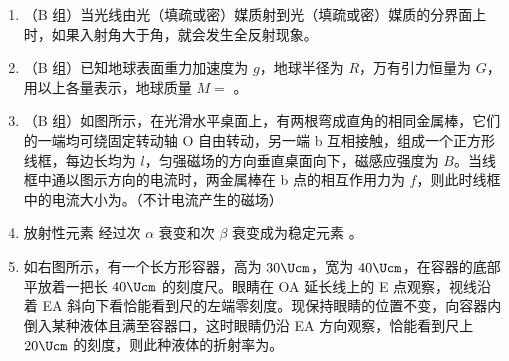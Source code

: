\documentclass[\gkver]{gaokaozhenti}
\begin{document}
\begin{enumerate}
\item
（B 组）当光线由光（填疏或密）媒质射到光（填疏或密）媒质的分界面上时，如果入射角大于角，就会发生全反射现象。

\item
（B 组）已知地球表面重力加速度为 $g$，地球半径为 $R$，万有引力恒量为 $G$，用以上各量表示，地球质量 $M =$ 。

\item
（B 组）如图所示，在光滑水平桌面上，有两根弯成直角的相同金属棒，它们的一端均可绕固定转动轴 O 自由转动，另一端 b 互相接触，组成一个正方形线框，每边长均为 $l$，匀强磁场的方向垂直桌面向下，磁感应强度为 $B$。当线框中通以图示方向的电流时，两金属棒在 b 点的相互作用力为 $f$，则此时线框中的电流大小为。（不计电流产生的磁场）
\onepicture[align=right, h=3.61cm]{}

\item
放射性元素  经过次 $\alpha$ 衰变和次 $\beta$ 衰变成为稳定元素 。

\item
如右图所示，有一个长方形容器，高为 $30\Ucm$，宽为 $40\Ucm$，在容器的底部平放着一把长 $40\Ucm$ 的刻度尺。眼睛在 OA 延长线上的 E 点观察，视线沿着 EA 斜向下看恰能看到尺的左端零刻度。现保持眼睛的位置不变，向容器内倒入某种液体且满至容器口，这时眼睛仍沿 EA 方向观察，恰能看到尺上 $20\Ucm$ 的刻度，则此种液体的折射率为。
\onepicture[align=right, w=4.11cm]{}


\end{enumerate}
\end{document}
